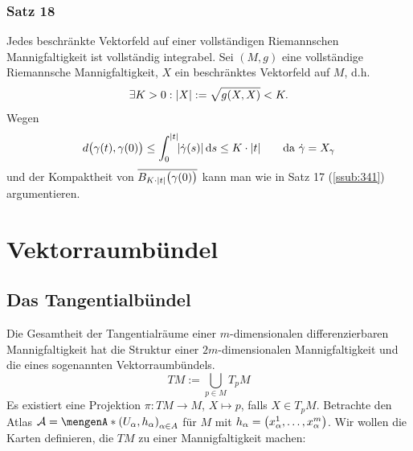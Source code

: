 \subsubsection{Satz 18} %
\label{ssub:342}
Jedes beschränkte Vektorfeld auf einer vollständigen Riemannschen Mannigfaltigkeit ist vollständig integrabel.
Sei $(M,g)$ eine vollständige Riemannsche Mannigfaltigkeit, $X$ ein beschränktes Vektorfeld auf $M$, d.h. 
\[
	\exists K > 0 : \abs*{X} := \sqrt{g(X,X)} < K.   
\]
Wegen
\begin{align*}
	d \enbrace[\big]{\gamma(t), \gamma(0)} \le \int_{0} ^{\abs*{t}} \!  \abs*{\dot{\gamma}(s)}  \, \mathrm{d}s \le K \cdot \abs*{t} \tag*{da $\dot{\gamma} = X_\gamma$}
\end{align*}
und der Kompaktheit von $\overline{B_{K \cdot \abs*{t}} \enbrace[\big]{\gamma(0)} } $ kann man wie in Satz 17 (\ref{ssub:341}) argumentieren. \bewende
\newpage

\section{Vektorraumbündel} %
\label{sec:4}

\subsection{Das Tangentialbündel} %
\label{sub:41}
Die Gesamtheit der Tangentialräume einer $m$-dimensionalen differenzierbaren Mannigfaltigkeit hat die Struktur einer $2m$-dimensionalen Mannigfaltigkeit und die eines
sogenannten Vektorraumbündels.
\[
	TM := \bigcup_{p \in M} T_pM
\]
Es existiert eine Projektion $\pi : T M  \to M $, $X \mapsto p$, falls $X \in T_pM$. Betrachte den Atlas $\mathcal{A} = \set{(U_\alpha, h_\alpha)}_{\alpha \in A} $ für $M$ mit 
$h_\alpha = \enbrace*{x^1_\alpha, \ldots , x^m_\alpha}$. Wir wollen die Karten definieren, die $T M$ zu einer Mannigfaltigkeit machen:

